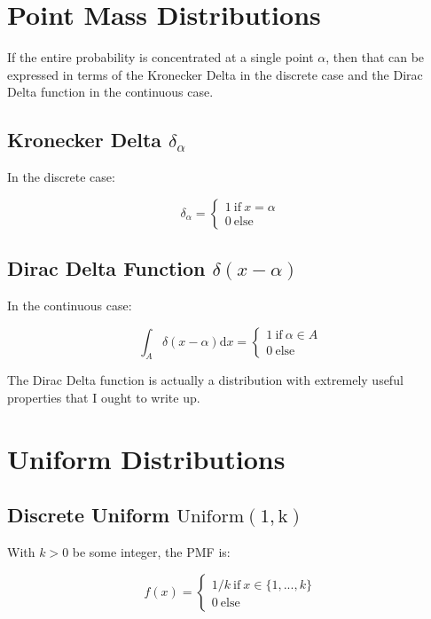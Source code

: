 \section{Point Mass Distributions}

If the entire probability is concentrated at a single point $\alpha$, then that can be expressed in terms of the Kronecker Delta in the discrete case and the Dirac Delta function in the continuous case.

\subsection{Kronecker Delta $\delta_{\alpha}$}
In the discrete case:

\begin{equation}
\delta_{\alpha} = \left\{\begin{array}{l} 1\mathrm{\ if\ }x = \alpha \\ 0\mathrm{\ else}\end{array} \right.
\end{equation}

\subsection{Dirac Delta Function $\delta(x-\alpha)$}
In the continuous case:

\begin{equation}
\int_A \delta(x-\alpha) \mathrm{d}x = \left\{\begin{array}{l} 1\mathrm{\ if\ }\alpha \in A \\ 0\mathrm{\ else}\end{array} \right.
\end{equation}

The Dirac Delta function is actually a distribution with extremely useful properties that I ought to write up. 

\section{Uniform Distributions}

\subsection{Discrete Uniform $\mathrm{Uniform(1,k)}$}
With $k>0$ be some integer, the PMF is:

\begin{equation}
f(x) = \left\{\begin{array}{l} 1/k \mathrm{\ if\ }x \in \{1,...,k\} \\ 0\mathrm{\ else}\end{array} \right.
\end{equation}

